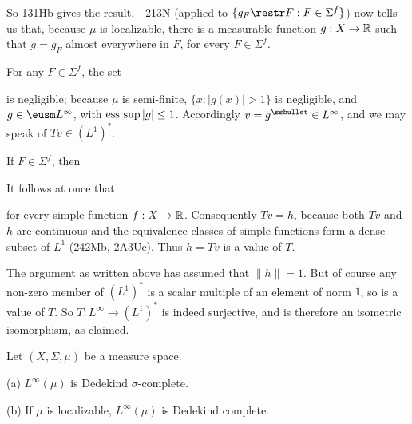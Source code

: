 {\noindent So 131Hb gives the result.\ \QeD\   213N (applied to
$\{g_F\restr F:F\in\Sigma^f\}$) now tells us
that, because $\mu$ is localizable, there is a measurable function
$g:X\to\Bbb R$ such that $g=g_F$ almost everywhere in $F$, for every
$F\in\Sigma^f$.
     
\medskip
     
 For any $F\in\Sigma^f$, the set
     
     
\noindent is negligible;  because $\mu$ is semi-finite,
$\{x:|g(x)|>1\}$ is negligible, and $g\in\eusm L^{\infty}$, with
$\mathop{\text{ess sup}}|g|\le 1$.   Accordingly $v=g^{\ssbullet}\in L^{\infty}$, and we
may speak of $Tv\in(L^1)^*$.
     
\medskip
     
 If $F\in\Sigma^f$, then

     
\noindent It follows at once that

     
\noindent for every simple function $f:X\to\Bbb R$.
Consequently $Tv=h$, because both $Tv$ and $h$ are
continuous and the equivalence classes of simple functions form a dense
subset of $L^1$ (242Mb, 2A3Uc).   Thus $h=Tv$ is a value of $T$.
     
\medskip
     
 The
argument as written above has assumed that $\|h\|=1$.   But of course
any non-zero member of $(L^1)^*$ is a scalar multiple of an element of
norm $1$, so is a value of $T$.   So $T:L^{\infty}\to(L^1)^*$ is indeed
surjective, and is therefore an isometric isomorphism, as claimed.
}%
     
 Let $(X,\Sigma,\mu)$ be a measure space.
     
(a) $L^{\infty}(\mu)$ is Dedekind $\sigma$-complete.
     
(b) If $\mu$ is localizable, $L^{\infty}(\mu)$ is Dedekind complete.
     

